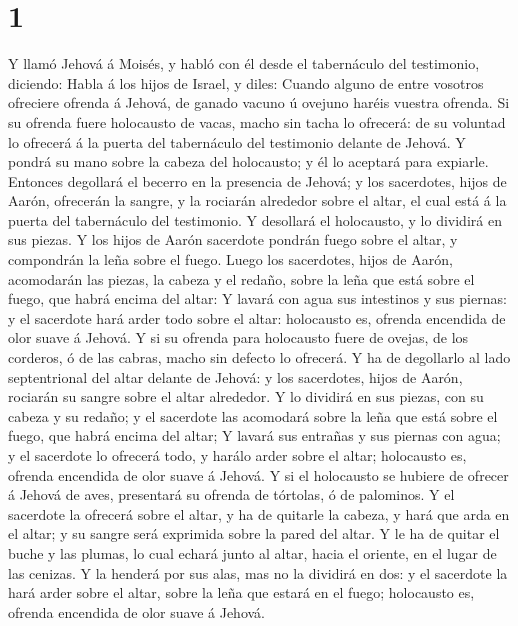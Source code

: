 \hypertarget{section}{%
\section{1}\label{section}}

 Y llamó Jehová á Moisés, y habló con él desde el
tabernáculo del testimonio, diciendo:  Habla á los hijos
de Israel, y diles: Cuando alguno de entre vosotros ofreciere ofrenda á
Jehová, de ganado vacuno ú ovejuno haréis vuestra ofrenda.
 Si su ofrenda fuere holocausto de vacas, macho sin tacha
lo ofrecerá: de su voluntad lo ofrecerá á la puerta del tabernáculo del
testimonio delante de Jehová.  Y pondrá su mano sobre la
cabeza del holocausto; y él lo aceptará para expiarle. 
Entonces degollará el becerro en la presencia de Jehová; y los
sacerdotes, hijos de Aarón, ofrecerán la sangre, y la rociarán alrededor
sobre el altar, el cual está á la puerta del tabernáculo del testimonio.
 Y desollará el holocausto, y lo dividirá en sus piezas.
 Y los hijos de Aarón sacerdote pondrán fuego sobre el
altar, y compondrán la leña sobre el fuego.  Luego los
sacerdotes, hijos de Aarón, acomodarán las piezas, la cabeza y el
redaño, sobre la leña que está sobre el fuego, que habrá encima del
altar:  Y lavará con agua sus intestinos y sus piernas: y
el sacerdote hará arder todo sobre el altar: holocausto es, ofrenda
encendida de olor suave á Jehová.  Y si su ofrenda para
holocausto fuere de ovejas, de los corderos, ó de las cabras, macho sin
defecto lo ofrecerá.  Y ha de degollarlo al lado
septentrional del altar delante de Jehová: y los sacerdotes, hijos de
Aarón, rociarán su sangre sobre el altar alrededor.  Y lo
dividirá en sus piezas, con su cabeza y su redaño; y el sacerdote las
acomodará sobre la leña que está sobre el fuego, que habrá encima del
altar;  Y lavará sus entrañas y sus piernas con agua; y
el sacerdote lo ofrecerá todo, y harálo arder sobre el altar; holocausto
es, ofrenda encendida de olor suave á Jehová.  Y si el
holocausto se hubiere de ofrecer á Jehová de aves, presentará su ofrenda
de tórtolas, ó de palominos.  Y el sacerdote la ofrecerá
sobre el altar, y ha de quitarle la cabeza, y hará que arda en el altar;
y su sangre será exprimida sobre la pared del altar.  Y
le ha de quitar el buche y las plumas, lo cual echará junto al altar,
hacia el oriente, en el lugar de las cenizas.  Y la
henderá por sus alas, mas no la dividirá en dos: y el sacerdote la hará
arder sobre el altar, sobre la leña que estará en el fuego; holocausto
es, ofrenda encendida de olor suave á Jehová.

